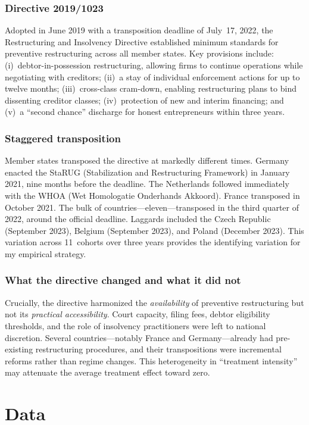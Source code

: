 \documentclass[12pt]{article}
\begin{document}
\subsubsection*{Directive 2019/1023} Adopted in June 2019 with a transposition deadline of July~17, 2022, the Restructuring and Insolvency Directive established minimum standards for preventive restructuring across all member states. Key provisions include: (i)~debtor-in-possession restructuring, allowing firms to continue operations while negotiating with creditors; (ii)~a stay of individual enforcement actions for up to twelve months; (iii)~cross-class cram-down, enabling restructuring plans to bind dissenting creditor classes; (iv)~protection of new and interim financing; and (v)~a ``second chance'' discharge for honest entrepreneurs within three years.

\subsubsection*{Staggered transposition} Member states transposed the directive at markedly different times. Germany enacted the StaRUG (Stabilization and Restructuring Framework) in January 2021, nine months before the deadline. The Netherlands followed immediately with the WHOA (Wet Homologatie Onderhands Akkoord). France transposed in October 2021. The bulk of countries---eleven---transposed in the third quarter of 2022, around the official deadline. Laggards included the Czech Republic (September 2023), Belgium (September 2023), and Poland (December 2023). This variation across 11~cohorts over three years provides the identifying variation for my empirical strategy.

\subsubsection*{What the directive changed and what it did not} Crucially, the directive harmonized the \textit{availability} of preventive restructuring but not its \textit{practical accessibility}. Court capacity, filing fees, debtor eligibility thresholds, and the role of insolvency practitioners were left to national discretion. Several countries---notably France and Germany---already had pre-existing restructuring procedures, and their transpositions were incremental reforms rather than regime changes. This heterogeneity in ``treatment intensity'' may attenuate the average treatment effect toward zero.


\section{Data}
\label{sec:data}
\end{document}
